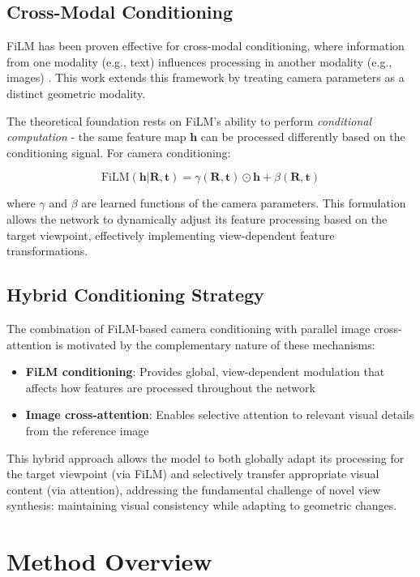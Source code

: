 \subsection{Cross-Modal Conditioning}

FiLM has been proven effective for cross-modal conditioning, where information from one modality (e.g., text) influences processing in another modality (e.g., images) \cite{film, filmedunet}. This work extends this framework by treating camera parameters as a distinct geometric modality.

The theoretical foundation rests on FiLM's ability to perform \textit{conditional computation} - the same feature map $\mathbf{h}$ can be processed differently based on the conditioning signal. For camera conditioning:

\[ \text{FiLM}(\mathbf{h}|\mathbf{R}, \mathbf{t}) = \gamma(\mathbf{R}, \mathbf{t}) \odot \mathbf{h} + \beta(\mathbf{R}, \mathbf{t}) \]

where $\gamma$ and $\beta$ are learned functions of the camera parameters. This formulation allows the network to dynamically adjust its feature processing based on the target viewpoint, effectively implementing view-dependent feature transformations.

\subsection{Hybrid Conditioning Strategy}

The combination of FiLM-based camera conditioning with parallel image cross-attention is motivated by the complementary nature of these mechanisms:

\begin{itemize}
  \item \textbf{FiLM conditioning}: Provides global, view-dependent modulation that affects how features are processed throughout the network
  \item \textbf{Image cross-attention}: Enables selective attention to relevant visual details from the reference image
\end{itemize}

This hybrid approach allows the model to both globally adapt its processing for the target viewpoint (via FiLM) and selectively transfer appropriate visual content (via attention), addressing the fundamental challenge of novel view synthesis: maintaining visual consistency while adapting to geometric changes.

\section{Method Overview}\label{sec:overview}

